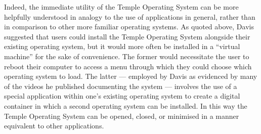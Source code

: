\documentclass[Draft.tex]{subfiles}
\begin{document}

Indeed, the immediate utility of the Temple Operating System can be more helpfully understood in
analogy to the use of applications in general, rather than
in comparison to other more familiar operating systems.
As quoted above, Davis suggested that users could install the Temple Operating System
alongside their existing operating system, but it would more often
be installed in a ``virtual machine'' for the sake of convenience.
The former would necessitate the user to reboot their computer
to access a menu through which they could choose which operating system to
load.
The latter --- employed by Davis as evidenced by many of the
videos he published documenting the system --- involves the use of a special
application within one's existing operating system to create a digital container
in which a second operating system can be installed.
In this way the Temple Operating System can be opened, closed, or minimised in a manner
equivalent to other applications.
\end{document}
